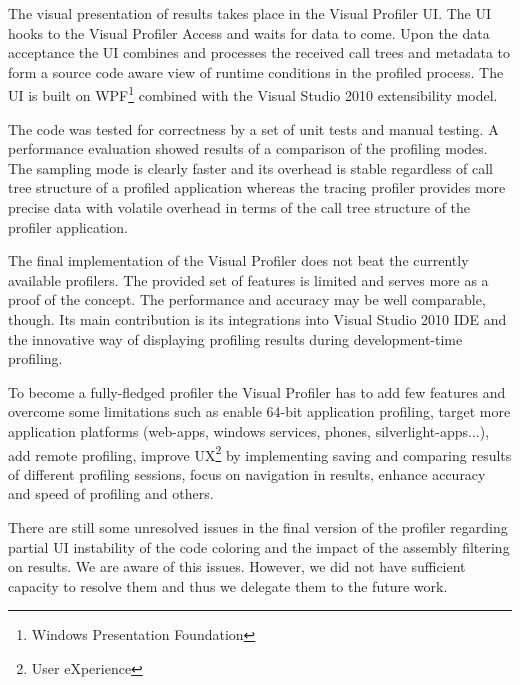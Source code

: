 The visual presentation of results takes place in the Visual Profiler UI. The UI hooks to the Visual Profiler Access and waits for data to come. Upon the data acceptance the UI combines and processes the received call trees and metadata to form a source code aware view of runtime conditions in the profiled process. The UI is built on WPF\footnote{Windows Presentation Foundation} combined with the Visual Studio 2010 extensibility model. 

The code was tested for correctness by a set of unit tests and manual testing. A performance evaluation showed results of a comparison of the profiling
modes. The sampling mode is clearly faster and its overhead is stable regardless of call tree structure of a profiled application whereas the tracing profiler provides more precise data with volatile overhead in terms of the call tree structure of the profiler application.

The final implementation of the Visual Profiler does not beat the currently available profilers. The provided set of features is limited and serves more as a proof of the concept. The performance and accuracy may be well comparable, though. Its main contribution is its integrations into Visual Studio 2010 IDE and the innovative way of displaying profiling results during development-time profiling.

To become a fully-fledged profiler the Visual Profiler has to add few features and overcome some limitations such as 
enable 64-bit application profiling,
target more application platforms (web-apps, windows services, phones, silverlight-apps...),
add remote profiling,
improve UX\footnote{User eXperience} by implementing saving and comparing results of different profiling sessions, focus on navigation in results,
enhance accuracy and speed of profiling and others.

There are still some unresolved issues in the final version of the profiler regarding partial UI instability of the code coloring and the impact of the assembly filtering on results. We are aware of this issues. However, we did not have sufficient capacity to resolve them and thus we delegate them to the future work.






































